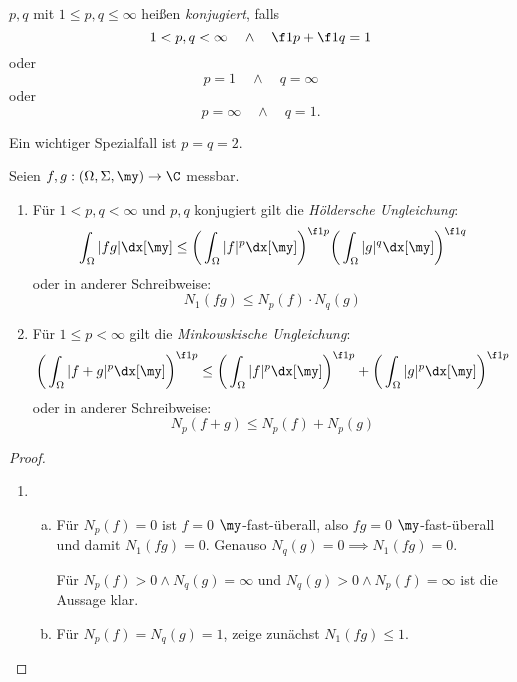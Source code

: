 \begin{df} \label{2.6}
	$p,q$ mit $1 \le p,q \le \infty$ heißen \emph{konjugiert}, falls
	\[
		1 < p, q < \infty \quad\land\quad \f 1p + \f 1q = 1
	\]
	oder
	\[
		p = 1 \quad\land\quad q = \infty
	\]
	oder
	\[
		p = \infty \quad\land\quad q = 1.
	\]
	\begin{note}
		Ein wichtiger Spezialfall ist $p=q=2$.
	\end{note}
\end{df}


\begin{st} \label{2.7}
	Seien $f,g : (\Omega, \Sigma, \my) \to \C$ messbar.
	\begin{enumerate}[1)]
		\item
			Für $1 < p,q < \infty$ und $p,q$ konjugiert gilt die \emph{Höldersche Ungleichung}:
			\[
				\int_{\Omega} |fg| \dx[\my] \le \bigg(\int_{\Omega}|f|^p \dx[\my] \bigg)^{\f 1p} \bigg( \int_{\Omega} |g|^q \dx[\my] \bigg)^{\f 1q}
			\]
			oder in anderer Schreibweise:
			\[
				N_1(fg) \le N_p(f) \cdot N_q(g)
			\]
		\item
			Für $1 \le p < \infty$ gilt die \emph{Minkowskische Ungleichung}:
			\[
				\bigg( \int_{\Omega} |f+g|^p \dx[\my] \bigg)^{\f 1p} \le  \bigg(\int_{\Omega} |f|^p \dx[\my]\bigg)^{\f 1p} + \bigg( \int_{\Omega} |g|^p \dx[\my] \bigg)^{\f 1p}
			\]
			oder in anderer Schreibweise:
			\[
				N_p(f+g) \le N_p(f) + N_p(g)
			\]
	\end{enumerate}
	\begin{proof}
		\begin{enumerate}[1)]
			\item
				\begin{enumerate}[a)]
					\item
						Für $N_p(f) = 0$ ist $f =0 $ $\my$-fast-überall, also $fg = 0$ $\my$-fast-überall und damit $N_1(fg) = 0$.
						Genauso $N_q(g) = 0 \implies N_1(fg) = 0$.

						Für $N_p(f) > 0 \land N_q(g) = \infty$ und $N_q(g) > 0 \land N_p(f) = \infty$ ist die Aussage klar.
					\item
						Für $N_p(f) = N_q(g) = 1$, zeige zunächst $N_1(fg) \le 1$.


\end{enumerate}
\end{enumerate}
\end{proof}
\end{st}

